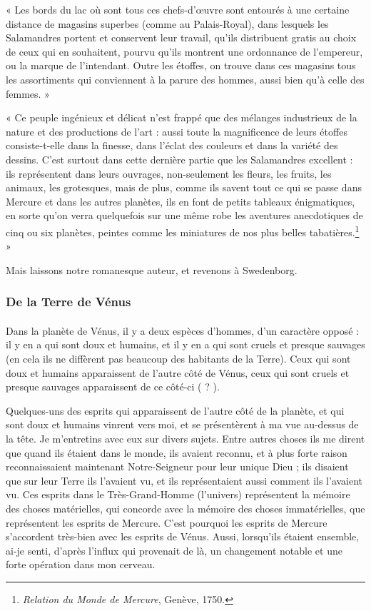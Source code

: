 \documentclass[a4paper, 11pt, oneside]{article}
\begin{document}
« Les bords du lac où sont tous ces chefs-d'œuvre sont entourés à une certaine distance de magasins superbes (comme au Palais-Royal), dans lesquels les Salamandres portent et conservent leur travail, qu'ils distribuent gratis au choix de ceux qui en souhaitent, pourvu qu'ils montrent une ordonnance de l'empereur, ou la marque de l'intendant. Outre les étoffes, on trouve dans ces magasins tous les assortiments qui conviennent à la parure des hommes, aussi bien qu'à celle des femmes. »

« Ce peuple ingénieux et délicat n'est frappé que des mélanges industrieux de la nature et des productions de l'art : aussi toute la magnificence de leurs étoffes consiste-t-elle dans la finesse, dans l'éclat des couleurs et dans la variété des dessins. C'est surtout dans cette dernière partie que les Salamandres excellent : ils représentent dans leurs ouvrages, non-seulement les fleurs, les fruits, les animaux, les grotesques, mais de plus, comme ils savent tout ce qui se passe dans Mercure et dans les autres planètes, ils en font de petits tableaux énigmatiques, en sorte qu'on verra quelquefois sur une même robe les aventures anecdotiques de cinq ou six planètes, peintes comme les miniatures de nos plus belles tabatières.\footnote{\emph{Relation du Monde de Mercure}, Genève, 1750.} »

Mais laissons notre romanesque auteur, et revenons à Swedenborg.

\subsubsection{De la Terre de Vénus}
\paragraph{}
Dans la planète de Vénus, il y a deux espèces d'hommes, d'un caractère opposé : il y en a qui sont doux et humains, et il y en a qui sont cruels et presque sauvages (en cela ils ne diffèrent pas beaucoup des habitants de la Terre). Ceux qui sont doux et humains apparaissent de l'autre côté de Vénus, ceux qui sont cruels et presque sauvages apparaissent de ce côté-ci ( ? ).

Quelques-uns des esprits qui apparaissent de l'autre côté de la planète, et qui sont doux et humains vinrent vers moi, et se présentèrent à ma vue au-dessus de la tête. Je m'entretins avec eux sur divers sujets. Entre autres choses ils me dirent que quand ils étaient dans le monde, ils avaient reconnu, et à plus forte raison reconnaissaient maintenant Notre-Seigneur pour leur unique Dieu ; ils disaient que sur leur Terre ils l'avaient vu, et ils représentaient aussi comment ils l'avaient vu. Ces esprits dans le Très-Grand-Homme (l'univers) représentent la mémoire des choses matérielles, qui concorde avec la mémoire des choses immatérielles, que représentent les esprits de Mercure. C'est pourquoi les esprits de Mercure s'accordent très-bien avec les esprits de Vénus. Aussi, lorsqu'ils étaient ensemble, ai-je senti, d'après l'influx qui provenait de là, un changement notable et une forte opération dans mon cerveau.
\end{document}
